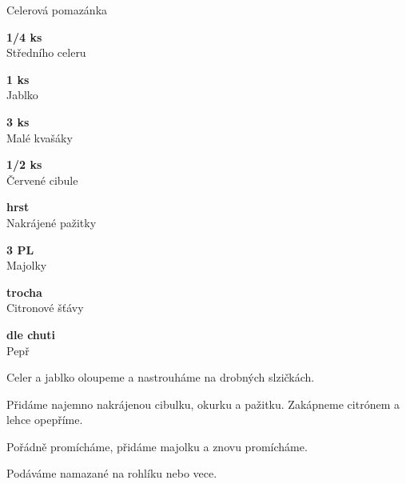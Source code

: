 \documentclass[11pt,a4paper]{article}
\begin{document}
\begin{recipe}[LightSeaGreen]{Celerová pomazánka}
    \begin{ingredients}
        \item \parbox[t]{\linewidth}{\raggedright \piece \textbf{1/4 ks}\\ Středního celeru}
        \item \parbox[t]{\linewidth}{\raggedright \piece \textbf{1 ks}\\ Jablko}
        \item \parbox[t]{\linewidth}{\raggedright \piece \textbf{3 ks}\\ Malé kvašáky}
        \item \parbox[t]{\linewidth}{\raggedright \piece \textbf{1/2 ks}\\ Červené cibule}
        \item \parbox[t]{\linewidth}{\raggedright \indefinite \textbf{hrst}\\ Nakrájené pažitky}
        \item \parbox[t]{\linewidth}{\raggedright \spoon \textbf{3 PL}\\ Majolky}
        \item \parbox[t]{\linewidth}{\raggedright \liquid \textbf{trocha}\\ Citronové šťávy}
        \item \parbox[t]{\linewidth}{\raggedright \indefinite \textbf{dle chuti}\\ Pepř}
    \end{ingredients}
    \begin{steps}
        \item Celer a jablko oloupeme a nastrouháme na drobných slzičkách.
        \item Přidáme najemno nakrájenou cibulku, okurku a pažitku. Zakápneme citrónem a lehce opepříme.
        \item Pořádně promícháme, přidáme majolku a znovu promícháme.
        \item Podáváme namazané na rohlíku nebo vece.
    \end{steps}
\end{recipe}

\end{document}
